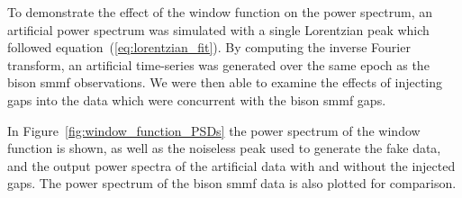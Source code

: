 To demonstrate the effect of the window function on the power spectrum, an artificial power spectrum was simulated with a single Lorentzian peak which followed equation~(\ref{eq:lorentzian_fit}). By computing the inverse Fourier transform, an artificial time-series was generated over the same epoch as the \gls{bison} \gls{smmf} observations. We were then able to examine the effects of injecting gaps into the data which were concurrent with the \gls{bison} \gls{smmf} gaps. 

In Figure~\ref{fig:window_function_PSDs} the power spectrum of the window function is shown, as well as the noiseless peak used to generate the fake data, and the output power spectra of the artificial data with and without the injected gaps. The power spectrum of the \gls{bison} \gls{smmf} data is also plotted for comparison.



